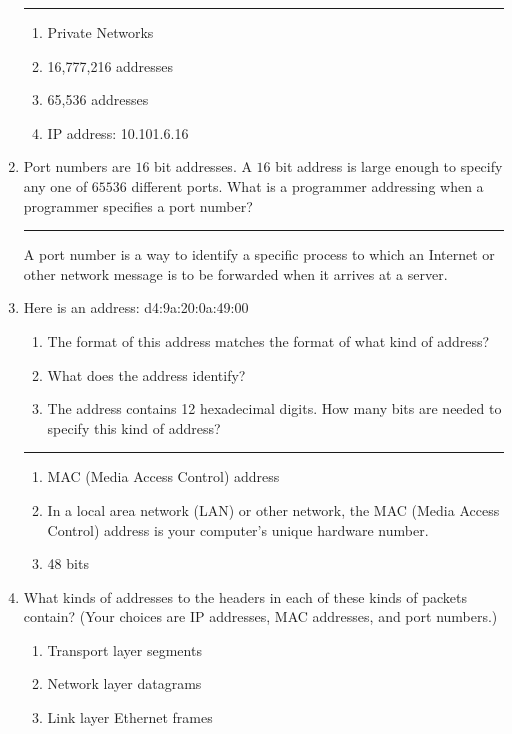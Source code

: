 \documentclass[twoside]{article}
\newenvironment{answer}
  {\vspace*{0.2cm} \rule{12cm}{0.04cm} \vspace*{0.2cm}}
  {\vspace*{0.2cm}}
\begin{document}
\begin{enumerate}
  \begin{answer}

  \begin{enumerate}
    \item Private Networks
    \item 16,777,216 addresses
    \item 65,536 addresses
    \item IP address: 10.101.6.16
    \end{enumerate}

    \end{answer}

  \item Port numbers are $16$ bit addresses. A $16$ bit address is large
    enough to specify any one of $65536$ different ports. What is a programmer
    addressing when a programmer specifies a port number?

  \begin{answer}
    A port number is a way to identify a specific process to which an Internet or other network message is to be forwarded when it arrives at a server. 
    \end{answer}

  \item Here is an address: d4:9a:20:0a:49:00
  \begin{enumerate}
    \item The format of this address matches the format of what kind of address?
    \item What does the address identify?
    \item The address contains 12 hexadecimal digits. How many bits are needed
      to specify this kind of address?
    \end{enumerate}
  
  \begin{answer}

  \begin{enumerate}
    \item MAC (Media Access Control) address
    \item In a local area network (LAN) or other network, the MAC (Media Access Control) address is your computer's unique hardware number.
    \item 48 bits
    \end{enumerate}

    \end{answer}

  \item What kinds of addresses to the headers in each of these kinds
      of packets contain? (Your choices are IP addresses, MAC addresses,
      and port numbers.)
  \begin{enumerate}
    \item Transport layer segments
    \item Network layer datagrams
    \item Link layer Ethernet frames
    \end{enumerate}


\end{enumerate}
\end{document}
